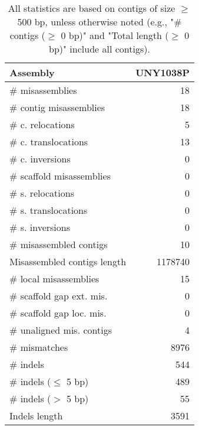 \documentclass[12pt,a4paper]{article}
\begin{document}
\begin{table}[ht]
\begin{center}
\caption{All statistics are based on contigs of size $\geq$ 500 bp, unless otherwise noted (e.g., "\# contigs ($\geq$ 0 bp)" and "Total length ($\geq$ 0 bp)" include all contigs).}
\begin{tabular}{|l*{1}{|r}|}
\hline
Assembly & UNY1038P \\ \hline
\# misassemblies & 18 \\ \hline
\hspace{2mm}\# contig misassemblies & 18 \\ \hline
\hspace{5mm}\# c. relocations & 5 \\ \hline
\hspace{5mm}\# c. translocations & 13 \\ \hline
\hspace{5mm}\# c. inversions & 0 \\ \hline
\hspace{2mm}\# scaffold misassemblies & 0 \\ \hline
\hspace{5mm}\# s. relocations & 0 \\ \hline
\hspace{5mm}\# s. translocations & 0 \\ \hline
\hspace{5mm}\# s. inversions & 0 \\ \hline
\# misassembled contigs & 10 \\ \hline
Misassembled contigs length & 1178740 \\ \hline
\# local misassemblies & 15 \\ \hline
\# scaffold gap ext. mis. & 0 \\ \hline
\# scaffold gap loc. mis. & 0 \\ \hline
\# unaligned mis. contigs & 4 \\ \hline
\# mismatches & 8976 \\ \hline
\# indels & 544 \\ \hline
\hspace{5mm}\# indels ($\leq$ 5 bp) & 489 \\ \hline
\hspace{5mm}\# indels ($>$ 5 bp) & 55 \\ \hline
Indels length & 3591 \\ \hline
\end{tabular}
\end{center}
\end{table}
\end{document}
